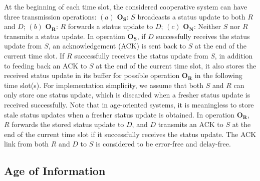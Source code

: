 \documentclass{IEEEtran}
\begin{document}
At the beginning of each time slot, the considered cooperative system can have three transmission operations:  $(a)$ $\mathbf{O}_{\mathbf{S}}$: $S$ broadcasts a status update to both $R$ and $D$; $(b)$  $\mathbf{O}_{\mathbf{R}}$: $R$ forwards a status update to $D$; $(c)$ $\mathbf{O}_{\mathbf{N}}$: Neither $S$ nor $R$ transmits a status update. In operation $\mathbf{O}_{\mathbf{S}}$, if $D$ successfully receives the status update from $S$, an acknowledgement (ACK) is sent back to $S$ at the end of the current time slot. If $R$ successfully receives the status update from $S$, in addition to feeding back an ACK to $S$ at the end of the current time slot, it also stores the received status update in its buffer for possible operation $\mathbf{O}_{\mathbf{R}}$ in the following time slot(s). For implementation simplicity, we assume that both $S$ and $R$ can only store one status update, which is discarded when a fresher status update is received successfully. Note that in age-oriented systems, it is meaningless to store stale status updates when a fresher status update is obtained. In operation $\mathbf{O}_{\mathbf{R}}$, $R$ forwards the stored status update to $D$, and $D$ transmits an ACK to $S$ at the end of the current time slot if it successfully receives the status update. The ACK link from both $R$ and $D$ to $S$ is considered to be error-free and delay-free.





\subsection{Age of Information}
\end{document}
